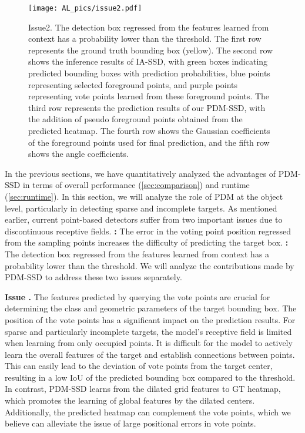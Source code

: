 \begin{figure}
	\centering
	\texttt{[image: AL\_pics/issue2.pdf]}
	\caption{Issue2. The detection box regressed from the features learned from context has a probability lower than the threshold. The first row represents the ground truth bounding box (yellow). The second row shows the inference results of IA-SSD, with green boxes indicating predicted bounding boxes with prediction probabilities, blue points representing selected foreground points, and purple points representing vote points learned from these foreground points. The third row represents the prediction results of our PDM-SSD, with the addition of pseudo foreground points obtained from the predicted heatmap. The fourth row shows the Gaussian coefficients of the foreground points used for final prediction, and the fifth row shows the angle coefficients.}
	\label{fig:issue2}
\end{figure}

In the previous sections, we have quantitatively analyzed the advantages of PDM-SSD in terms of overall performance (\ref{sec:comparison}) and runtime (\ref{sec:runtime}). In this section, we will analyze the role of PDM at the object level, particularly in detecting sparse and incomplete targets. As mentioned earlier, current point-based detectors suffer from two important issues due to discontinuous receptive fields. \textbf{\uppercase\expandafter{}:} The error in the voting point position regressed from the sampling points increases the difficulty of predicting the target box. \textbf{\uppercase\expandafter{}:} The detection box regressed from the features learned from context has a probability lower than the threshold. 
We will analyze the contributions made by PDM-SSD to address these two issues separately. 

\textbf{Issue \uppercase\expandafter{}.} The features predicted by querying the vote points are crucial for determining the class and geometric parameters of the target bounding box. The position of the vote points has a significant impact on the prediction results. For sparse and particularly incomplete targets, the model's receptive field is limited when learning from only occupied points. It is difficult for the model to actively learn the overall features of the target and establish connections between points. This can easily lead to the deviation of vote points from the target center, resulting in a low IoU of the predicted bounding box compared to the threshold. In contrast, PDM-SSD learns from the dilated grid features to GT heatmap, which promotes the learning of global features by the dilated centers. Additionally, the predicted heatmap can complement the vote points, which we believe can alleviate the issue of large positional errors in vote points.

